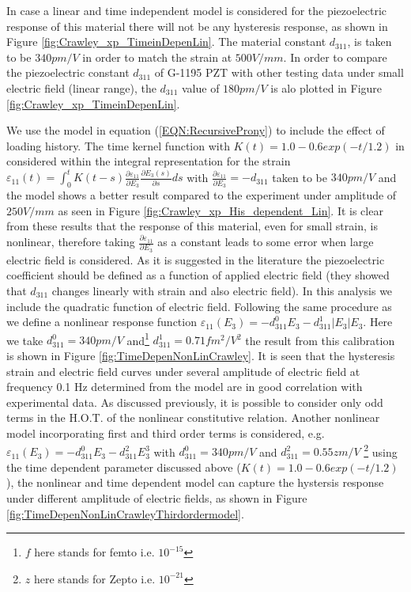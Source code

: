 In case a linear and time independent model is considered for the piezoelectric response of this material there will not be any hysteresis response, as shown in Figure \ref{fig:Crawley_xp_TimeinDepenLin}. 
The material constant $d_{311}$, is taken to be $340 pm/V$ in order to match the strain at $500 V/mm$. 
In order to compare the piezoelectric constant $d_{311}$ of G-1195 PZT with other testing data under small electric field (linear range), the $d_{311}$ value of $180 pm/V$ \cite{low1995modeling} is alo plotted in Figure \ref{fig:Crawley_xp_TimeinDepenLin}.

 
We use the model in equation (\ref{EQN:RecursiveProny}) \cite{tscharnuter2012nonlinear} to include the effect of loading history. 
The time kernel function with $K(t)=1.0-0.6 exp(-t/1.2)$ in considered within the integral representation for the strain $\varepsilon_{11}(t)=\int_0^t
K(t-s)\frac{\partial \varepsilon_{11}}{\partial E_3}\frac{\partial
E_3(s)}{\partial s} ds$ with $\frac{\partial \varepsilon_{11}}{\partial
E_3}=-d_{311}$ taken to be $340 pm/V$ and the model shows a better result compared to the experiment under amplitude of $250V/mm$ as seen in Figure \ref{fig:Crawley_xp_His_dependent_Lin}. 
It is clear from these results that the response of this material, even for small strain, is nonlinear, therefore taking $\frac{\partial\varepsilon_{11}}{\partial E_3}$ as a constant leads to some error when large electric field is considered.
As it is suggested in the literature \cite{anderson1989piezoceramic,Crawley1990} the piezoelectric coefficient should be defined as a function of applied electric field (they showed that $d_{311}$ changes linearly with strain and also electric field).
In this analysis we include the quadratic function of electric field. 
Following the same procedure as \cite{tscharnuter2012nonlinear} we define a nonlinear response function $\varepsilon_{11}(E_3)=-d_{311}^0 E_3-d_{311}^1 |E_3| E_3$.
Here we take $d_{311}^0=340pm/V$ and\footnote{$f$ here stands for femto i.e. $10^{-15}$ } $d_{311}^1=0.71 fm^2/V^2 $ the result from this calibration is shown in Figure \ref{fig:TimeDepenNonLinCrawley}. It is seen that the hysteresis strain and electric field curves under several amplitude of electric field at frequency 0.1 Hz determined from the model are in good correlation with experimental data.
As discussed previously, it is possible to consider only odd terms in the H.O.T. of the nonlinear constitutive relation.
Another nonlinear model incorporating first and third order terms is considered, e.g. $\varepsilon_{11}(E_3)=-d_{311}^0 E_3-d_{311}^2 E_3^3$ with $d_{311}^0=340pm/V$ and $d_{311}^2=0.55 z m/V$ \footnote{$z$ here stands for Zepto i.e. $10^{-21}$ } using the time dependent parameter discussed above ($K(t)=1.0-0.6 exp(-t/1.2)$), 
the nonlinear and time dependent model can capture the hystersis response under different amplitude of electric fields, as shown in Figure \ref{fig:TimeDepenNonLinCrawleyThirdordermodel}. 

